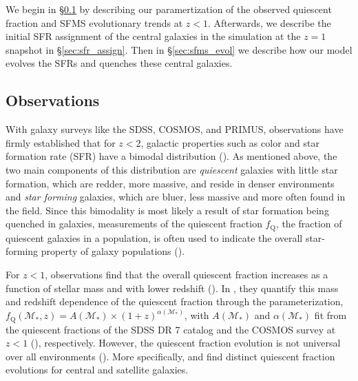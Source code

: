 We begin in \S \ref{sec:obvs} by describing our paramertization 
of the observed quiescent fraction and SFMS evolutionary trends at 
$z < 1$. Afterwards, we describe the initial SFR assignment of the
central galaxies in the simulation at the $z = 1$ snapshot in \S \ref{sec:sfr_assign}. 
Then in \S \ref{sec:sfms_evol} we describe how our model evolves 
the SFRs and quenches these central galaxies. 

\subsection{Observations} \label{sec:obvs}
With galaxy surveys like the SDSS, COSMOS, and PRIMUS, observations 
have firmly established that for $z < 2$, galactic properties such as 
color and star formation rate (SFR) have a bimodal distribution 
(\citealt{Baldry:2006aa, Cooper:2007aa, Blanton:2009aa, Moustakas:2013aa}).
As mentioned above, the two main components of this distribution are 
{\em quiescent} galaxies with little star formation, which are redder, 
more massive, and reside in denser environments and {\em star forming} 
galaxies, which are bluer, less massive and more often found in the field. 
Since this bimodality is most likely a result of star formation being 
quenched in galaxies, measurements of the quiescent fraction 
$f_\mathrm{Q}$, the fraction of quiescent galaxies in a population, is often 
used to indicate the overall star-forming property of galaxy populations 
(\citealt{Baldry:2006aa, Drory:2009aa, Cooper:2010aa, Iovino:2010aa, Peng:2010aa, 
Geha:2012aa, Kovac:2014aa, Hahn:2015aa}).

For $z < 1$, observations find that the overall quiescent fraction increases as a 
function of stellar mass and with lower redshift (\citealt{Drory:2009aa, Iovino:2010aa, 
Peng:2010aa, Kovac:2014aa, Hahn:2015aa}). In \cite{Wetzel:2013aa}, they quantify 
this mass and redshift dependence of the quiescent fraction through the parameterization, 
$f_\mathrm{Q} (\mathcal{M}_*, z) = A(\mathcal{M}_*) \times (1+z)^{\alpha(\mathcal{M}_*)}$,
with $A(\mathcal{M}_*)$ and $\alpha(\mathcal{M}_*)$ fit from the quiescent fractions of 
the SDSS DR 7 catalog and the COSMOS survey at $z < 1$ (\citealt{Drory:2009aa}), 
respectively. However, the quiescent fraction evolution is not universal over
all environments (\citealt{Hahn:2015aa}). More specifically, \cite{Tinker:2010aa} 
and \cite{Tinker:2013aa} find distinct quiescent fraction evolutions 
for central and satellite galaxies. 

